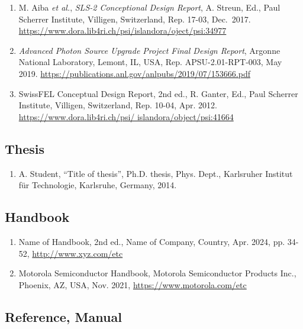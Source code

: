 \documentclass[%
               hyphens,       %
               ]{jacow}
\begin{document}
\begin{enumerate}[leftmargin=22pt, resume*]
	\item M. Aiba \textit{et al.}, \textit{SLS-2 Conceptional Design Report}, 
		A. Streun, Ed., Paul Scherrer Institute, Villigen, Switzerland, Rep. 17-03, Dec.~2017. \url{https://www.dora.lib4ri.ch/psi/islandora/oject/psi:34977}

	\item \textit{Advanced Photon Source Upgrade Project Final Design Report}, 
		Argonne National Laboratory, Lemont, IL, USA, Rep. APSU-2.01-RPT-003, May 2019. \url{https://publications.anl.gov/anlpubs/2019/07/153666.pdf} 

	\item SwissFEL Conceptual Design Report, 2nd ed., 
		R. Ganter, Ed., Paul Scherrer Institute, Villigen, Switzerland, Rep. 10-04, Apr. 2012. \url{https://www.dora.lib4ri.ch/psi/ islandora/object/psi:41664} 
\end{enumerate}

\subsection{Thesis}

\begin{enumerate}[leftmargin=22pt, resume*]
	\item A. Student, “Title of thesis”, Ph.D. thesis, Phys. Dept., 
		Karlsruher Institut für Technologie, Karlsruhe, Germany, 2014.
\end{enumerate}

\subsection{Handbook}

\begin{enumerate}[leftmargin=22pt, resume*]
	\item Name of Handbook, 2nd ed., Name of Company, Country, 
		Apr. 2024, pp. 34-52, \url{http://www.xyz.com/etc}

	\item Motorola Semiconductor Handbook, Motorola Semiconductor Products Inc., 
		Phoenix, AZ, USA, Nov. 2021, \url{https://www.motorola.com/etc}
\end{enumerate}

\subsection{Reference, Manual}
\end{document}
